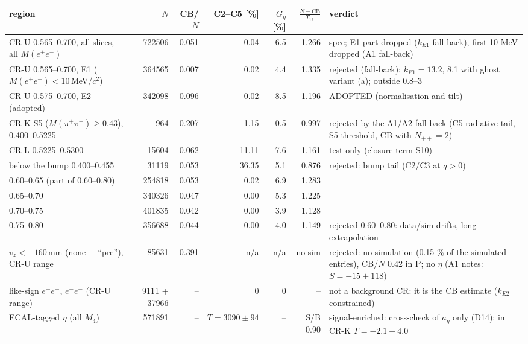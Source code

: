\begin{tabular}{p{5.2cm}rrrrrp{5.6cm}}
\toprule
region & $N$ & CB/$N$ & C2--C5 [\%] & $G_\eta$ [\%] & $\frac{N-\mathrm{CB}}{T_{12}}$ & verdict \\
\midrule
CR-U 0.565--0.700, all slices, all $M(e^+e^-)$ & 722506 & 0.051 & 0.04 & 6.5 & 1.266 & spec; E1 part dropped ($k_{E1}$ fall-back), first 10 MeV dropped (A1 fall-back) \\
CR-U 0.565--0.700, E1 ($M(e^+e^-)<10$\,MeV/$c^2$) & 364565 & 0.007 & 0.02 & 4.4 & 1.335 & rejected (fall-back): $k_{E1}=13.2$, 8.1 with ghost variant (a); outside 0.8--3 \\
CR-U 0.575--0.700, E2 (adopted) & 342098 & 0.096 & 0.02 & 8.5 & 1.196 & ADOPTED (normalisation and tilt) \\
CR-K S5 ($M(\pi^+\pi^-)\geq0.43$), 0.400--0.5225 & 964 & 0.207 & 1.15 & 0.5 & 0.997 & rejected by the A1/A2 fall-back (C5 radiative tail, S5 threshold, CB with $N_{++}=2$) \\
CR-L 0.5225--0.5300 & 15604 & 0.062 & 11.11 & 7.6 & 1.161 & test only (closure term S10) \\
below the bump 0.400--0.455 & 31119 & 0.053 & 36.35 & 5.1 & 0.876 & rejected: bump tail (C2/C3 at $q>0$) \\
0.60--0.65 (part of 0.60--0.80) & 254818 & 0.053 & 0.02 & 6.9 & 1.283 &  \\
0.65--0.70 & 340326 & 0.047 & 0.00 & 5.3 & 1.225 &  \\
0.70--0.75 & 401835 & 0.042 & 0.00 & 3.9 & 1.128 &  \\
0.75--0.80 & 356688 & 0.044 & 0.00 & 4.0 & 1.149 & rejected 0.60--0.80: data/sim drifts, long extrapolation \\
$v_z<-160$\,mm (none $-$ ``pre''), CR-U range & 85631 & 0.391 & n/a & n/a & no sim & rejected: no simulation (0.15 \% of the simulated entries), CB$/N$ 0.42 in P; no $\eta$ (A1 notes: $S=-15\pm118$) \\
like-sign $e^+e^+$, $e^-e^-$ (CR-U range) & 9111 + 37966 & -- & 0 & 0 & -- & not a background CR: it is the CB estimate ($k_{E2}$ constrained) \\
ECAL-tagged $\eta$ (all $M_4$) & 571891 & -- & $T=3090\pm94$ & -- & S/B 0.90 & signal-enriched: cross-check of $a_\eta$ only (D14); in CR-K $T=-2.1\pm4.0$ \\
\bottomrule
\end{tabular}
